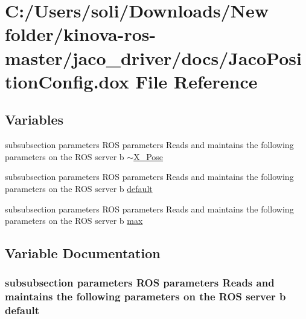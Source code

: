 \hypertarget{_jaco_position_config_8dox}{}\section{C\+:/\+Users/soli/\+Downloads/\+New folder/kinova-\/ros-\/master/jaco\+\_\+driver/docs/\+Jaco\+Position\+Config.dox File Reference}
\label{_jaco_position_config_8dox}
\subsection*{Variables}
\begin{DoxyCompactItemize}
\item 
subsubsection parameters R\+OS parameters Reads and maintains the following parameters on the R\+OS server b \hyperlink{_jaco_position_config_8dox_a9fff660751927d01485c1718209052c8}{$\sim$\+X\+\_\+\+Pose}
\item 
subsubsection parameters R\+OS parameters Reads and maintains the following parameters on the R\+OS server b \hyperlink{_jaco_position_config_8dox_a94d02332ecf13e7845f06fe8c343e101}{default}
\item 
subsubsection parameters R\+OS parameters Reads and maintains the following parameters on the R\+OS server b \hyperlink{_jaco_position_config_8dox_a55c9de72d9f3630abdf51bfe39c191dd}{max}
\end{DoxyCompactItemize}


\subsection{Variable Documentation}
\subsubsection[{\texorpdfstring{default}{default}}]{\setlength{\rightskip}{0pt plus 5cm}subsubsection parameters R\+OS parameters Reads and maintains the following parameters on the R\+OS server b default}\hypertarget{_jaco_position_config_8dox_a94d02332ecf13e7845f06fe8c343e101}{}\label{_jaco_position_config_8dox_a94d02332ecf13e7845f06fe8c343e101}

